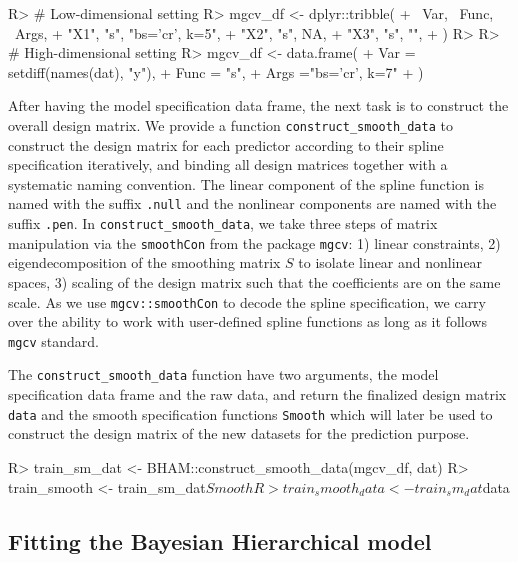 \documentclass[
]{jss}
\begin{document}
\begin{CodeChunk}
\begin{CodeInput}
R> # Low-dimensional setting
R> mgcv_df <- dplyr::tribble(
+   ~Var, ~Func, ~Args,
+   "X1",  "s",     "bs='cr', k=5",
+   "X2",  "s",     NA,
+   "X3",  "s",    "",
+ )
R> 
R> # High-dimensional setting
R> mgcv_df <- data.frame(
+   Var = setdiff(names(dat), "y"),
+   Func = "s",
+   Args ="bs='cr', k=7"
+ )
\end{CodeInput}
\end{CodeChunk}

After having the model specification data frame, the next task is to
construct the overall design matrix. We provide a function
\texttt{construct\_smooth\_data} to construct the design matrix for each
predictor according to their spline specification iteratively, and
binding all design matrices together with a systematic naming
convention. The linear component of the spline function is named with
the suffix \texttt{.null} and the nonlinear components are named with
the suffix \texttt{.pen}. In \texttt{construct\_smooth\_data}, we take
three steps of matrix manipulation via the \texttt{smoothCon} from the
package \texttt{mgcv}: 1) linear constraints, 2) eigendecomposition of
the smoothing matrix \(S\) to isolate linear and nonlinear spaces, 3)
scaling of the design matrix such that the coefficients are on the same
scale. As we use \texttt{mgcv::smoothCon} to decode the spline
specification, we carry over the ability to work with user-defined
spline functions as long as it follows \texttt{mgcv} standard.

The \texttt{construct\_smooth\_data} function have two arguments, the
model specification data frame and the raw data, and return the
finalized design matrix \texttt{data} and the smooth specification
functions \texttt{Smooth} which will later be used to construct the
design matrix of the new datasets for the prediction purpose.

\begin{CodeChunk}
\begin{CodeInput}
R> train_sm_dat <- BHAM::construct_smooth_data(mgcv_df, dat)
R> train_smooth <- train_sm_dat$Smooth
R> train_smooth_data <- train_sm_dat$data
\end{CodeInput}
\end{CodeChunk}

\subsection{Fitting the Bayesian Hierarchical model}
\end{document}
